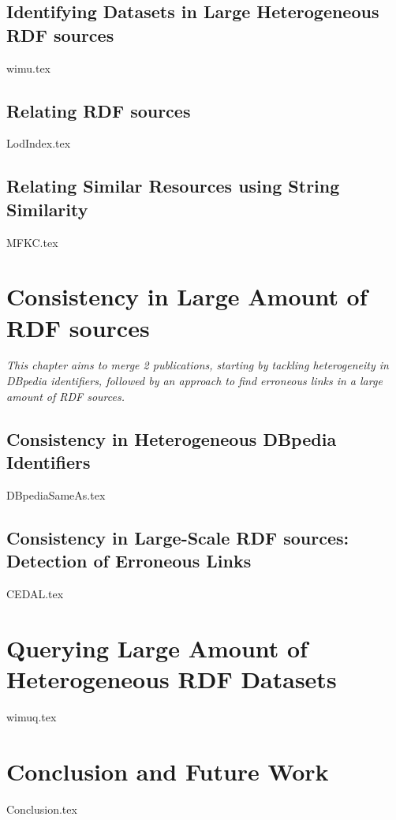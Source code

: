 \documentclass[ oneside,openright,titlepage,numbers=noenddot,headinclude,%
                footinclude=true,cleardoublepage=empty,abstractoff, %
                BCOR=5mm,paper=a4,fontsize=11pt,%
                 ngerman,american,%
                ]{scrreprt}
\begin{document}
\section{Identifying Datasets in Large Heterogeneous RDF sources} \label{ch:wimu}
{wimu.tex}

\newpage
\section{Relating RDF sources} \label{ch:lodindex}
{LodIndex.tex}

\newpage
\section{Relating Similar Resources using String Similarity} \label{ch:mfkc}
{MFKC.tex}

\newpage
\chapter{Consistency in Large Amount of RDF sources} \label{ch:consistency}
\textit{This chapter aims to merge 2 publications, starting by tackling heterogeneity in DBpedia identifiers, followed by an approach to find erroneous links in a large amount of RDF sources.}
\section{Consistency in Heterogeneous DBpedia Identifiers} \label{ch:dbpediasameas}
{DBpediaSameAs.tex}

\newpage
\section{Consistency in Large-Scale RDF sources: Detection of Erroneous Links} \label{ch:cedal}
{CEDAL.tex}

\newpage
\chapter{Querying Large Amount of Heterogeneous RDF Datasets} \label{ch:wimuq}
{wimuq.tex}

\newpage
\chapter{Conclusion and Future Work} \label{ch:conclusion}
{Conclusion.tex}
\end{document}
